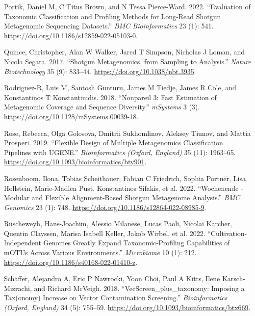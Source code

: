 \documentclass[
]{article}
\newlength{\cslhangindent}
\newlength{\cslentryspacingunit} %
\newenvironment{CSLReferences}[2] %
 {%
  \setlength{\parindent}{0pt}
  \ifodd #1
  \let\oldpar\par
  \def\par{\hangindent=\cslhangindent\oldpar}
  \fi
  \setlength{\parskip}{#2\cslentryspacingunit}
 }%
 {}
\begin{document}
\begin{CSLReferences}{1}{0}
\leavevmode{}%
Portik, Daniel M, C Titus Brown, and N Tessa Pierce-Ward. 2022.
{``Evaluation of Taxonomic Classification and Profiling Methods for
Long-Read Shotgun Metagenomic Sequencing Datasets.''} \emph{BMC
Bioinformatics} 23 (1): 541.
\url{https://doi.org/10.1186/s12859-022-05103-0}.

\leavevmode{}%
Quince, Christopher, Alan W Walker, Jared T Simpson, Nicholas J Loman,
and Nicola Segata. 2017. {``Shotgun Metagenomics, from Sampling to
Analysis.''} \emph{Nature Biotechnology} 35 (9): 833--44.
\url{https://doi.org/10.1038/nbt.3935}.

\leavevmode{}%
Rodriguez-R, Luis M, Santosh Gunturu, James M Tiedje, James R Cole, and
Konstantinos T Konstantinidis. 2018. {``Nonpareil 3: Fast Estimation of
Metagenomic Coverage and Sequence Diversity.''} \emph{mSystems} 3 (3).
\url{https://doi.org/10.1128/mSystems.00039-18}.

\leavevmode{}%
Rose, Rebecca, Olga Golosova, Dmitrii Sukhomlinov, Aleksey Tiunov, and
Mattia Prosperi. 2019. {``Flexible Design of Multiple Metagenomics
Classification Pipelines with {UGENE}.''} \emph{Bioinformatics (Oxford,
England)} 35 (11): 1963--65.
\url{https://doi.org/10.1093/bioinformatics/bty901}.

\leavevmode{}%
Rosenboom, Ilona, Tobias Scheithauer, Fabian C Friedrich, Sophia
Pörtner, Lisa Hollstein, Marie-Madlen Pust, Konstantinos Sifakis, et al.
2022. {``Wochenende - Modular and Flexible Alignment-Based Shotgun
Metagenome Analysis.''} \emph{BMC Genomics} 23 (1): 748.
\url{https://doi.org/10.1186/s12864-022-08985-9}.

\leavevmode{}%
Ruscheweyh, Hans-Joachim, Alessio Milanese, Lucas Paoli, Nicolai
Karcher, Quentin Clayssen, Marisa Isabell Keller, Jakob Wirbel, et al.
2022. {``Cultivation-Independent Genomes Greatly Expand
Taxonomic-Profiling Capabilities of {mOTUs} Across Various
Environments.''} \emph{Microbiome} 10 (1): 212.
\url{https://doi.org/10.1186/s40168-022-01410-z}.

\leavevmode{}%
Schäffer, Alejandro A, Eric P Nawrocki, Yoon Choi, Paul A Kitts, Ilene
Karsch-Mizrachi, and Richard McVeigh. 2018.
{``{VecScreen\_plus\_taxonomy}: Imposing a Tax(onomy) Increase on Vector
Contamination Screening.''} \emph{Bioinformatics (Oxford, England)} 34
(5): 755--59. \url{https://doi.org/10.1093/bioinformatics/btx669}.


\end{CSLReferences}
\end{document}
